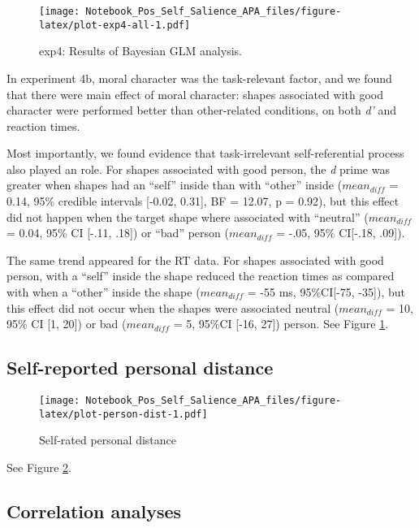 \documentclass[
  english,
  man]{apa6}
\begin{document}
\begin{figure}
\centering
\texttt{[image: Notebook\_Pos\_Self\_Salience\_APA\_files/figure-latex/plot-exp4-all-1.pdf]}
\caption{\label{fig:plot-exp4-all}exp4: Results of Bayesian GLM analysis.}
\end{figure}

In experiment 4b, moral character was the task-relevant factor, and we found that there were main effect of moral character: shapes associated with good character were performed better than other-related conditions, on both \emph{d'} and reaction times.

Most importantly, we found evidence that task-irrelevant self-referential process also played an role. For shapes associated with good person, the \emph{d} prime was greater when shapes had an ``self'' inside than with ``other'' inside (\(mean_{diff}\) = 0.14, 95\% credible intervals {[}-0.02, 0.31{]}, BF = 12.07, p = 0.92), but this effect did not happen when the target shape where associated with ``neutral'' (\(mean_{diff}\) = 0.04, 95\% CI {[}-.11, .18{]}) or ``bad'' person (\(mean_{diff}\) = -.05, 95\% CI{[}-.18, .09{]}).

The same trend appeared for the RT data. For shapes associated with good person, with a ``self'' inside the shape reduced the reaction times as compared with when a ``other'' inside the shape (\(mean_{diff}\) = -55 ms, 95\%CI{[}-75, -35{]}), but this effect did not occur when the shapes were associated neutral (\(mean_{diff}\) = 10, 95\% CI {[}1, 20{]}) or bad (\(mean_{diff}\) = 5, 95\%CI {[}-16, 27{]}) person. See Figure \ref{fig:plot-exp4-all}.

\hypertarget{self-reported-personal-distance}{%
\subsection{Self-reported personal distance}\label{self-reported-personal-distance}}

\begin{figure}
\centering
\texttt{[image: Notebook\_Pos\_Self\_Salience\_APA\_files/figure-latex/plot-person-dist-1.pdf]}
\caption{\label{fig:plot-person-dist}Self-rated personal distance}
\end{figure}

See Figure \ref{fig:plot-person-dist}.

\hypertarget{correlation-analyses}{%
\subsection{Correlation analyses}\label{correlation-analyses}}
\end{document}
